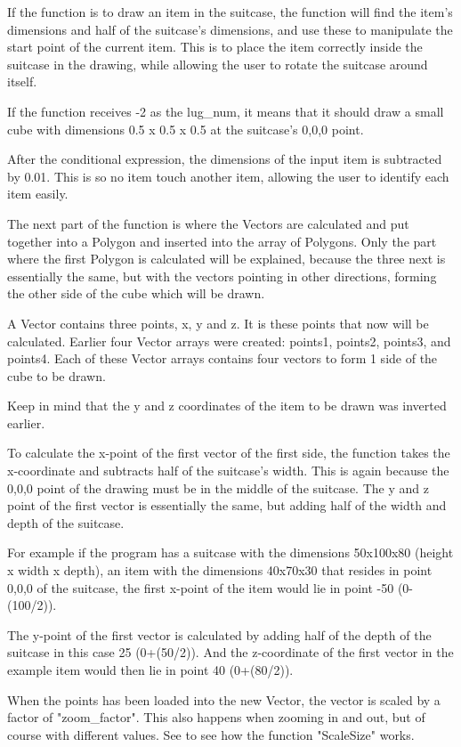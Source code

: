 If the function is to draw an item in the suitcase, the function will find the item's dimensions and half of the suitcase's dimensions, and use these to manipulate the start point of the current item. This is to place the item correctly inside the suitcase in the drawing, while allowing the user to rotate the suitcase around itself. 

If the function receives -2 as the lug\_num, it means that it should draw a small cube with dimensions 0.5 x 0.5 x 0.5 at the suitcase's 0,0,0 point.

After the conditional expression, the dimensions of the input item is subtracted by 0.01. This is so no item touch another item, allowing the user to identify each item easily. 

The next part of the function is where the Vectors are calculated and put together into a Polygon and inserted into the array of Polygons. Only the part where the first Polygon is calculated will be explained, because the three next is essentially the same, but with the vectors pointing in other directions, forming the other side of the cube which will be drawn.

A Vector contains three points, x, y and z. It is these points that now will be calculated. Earlier four Vector arrays were created: points1, points2, points3, and points4. Each of these Vector arrays contains four vectors to form 1 side of the cube to be drawn. 

Keep in mind that the y and z coordinates of the item to be drawn was inverted earlier. 

To calculate the x-point of the first vector of the first side, the function takes the x-coordinate and subtracts half of the suitcase's width. This is again because the 0,0,0 point of the drawing must be in the middle of the suitcase. The y and z point of the first vector is essentially the same, but adding half of the width and depth of the suitcase.

For example if the program has a suitcase with the dimensions 50x100x80 (height x width x depth), an item with the dimensions 40x70x30 that resides in point 0,0,0 of the suitcase, the first x-point of the item would lie in point -50 (0-(100/2)). 

The y-point of the first vector is calculated by adding half of the depth of the suitcase in this case 25 (0+(50/2)). And the z-coordinate of the first vector in the example item would then lie in point 40 (0+(80/2)).

When the points has been loaded into the new Vector, the vector is scaled by a factor of "zoom\_factor". This also happens when zooming in and out, but of course with different values. See  to see how the function "ScaleSize" works. 

